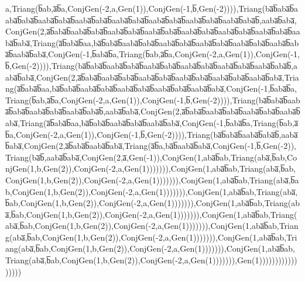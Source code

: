 a,Triang(b̅ab,a̅b̅a,ConjGen(-2,a,Gen(1)),ConjGen(-1,b̅,Gen(-2)))),Triang(ba̅b̅aba̅b̅aaba̅b̅aba̅b̅aaba̅b̅aba̅b̅aaba̅b̅aba̅b̅aaba̅b̅aba̅b̅aaba̅b̅aba̅b̅aaba̅b̅aba̅b̅aaba̅b̅aba̅b̅,aaba̅b̅aba̅,ConjGen(2,a̅b̅aba̅b̅aaba̅b̅aba̅b̅aaba̅b̅aba̅b̅aaba̅b̅aba̅b̅aaba̅b̅aba̅b̅aaba̅b̅aba̅b̅aaba̅b̅aba̅b̅aaba̅b̅aba̅,Triang(a̅b̅aba̅b̅aa,ba̅b̅aba̅b̅aaba̅b̅aba̅b̅aaba̅b̅aba̅b̅aaba̅b̅aba̅b̅aaba̅b̅aba̅b̅aaba̅b̅aba̅b̅aaba̅b̅aba̅,ConjGen(-1,b̅aba̅b̅a,Triang(b̅ab,a̅b̅a,ConjGen(-2,a,Gen(1)),ConjGen(-1,b̅,Gen(-2)))),Triang(ba̅b̅aba̅b̅aaba̅b̅aba̅b̅aaba̅b̅aba̅b̅aaba̅b̅aba̅b̅aaba̅b̅aba̅b̅aaba̅b̅aba̅b̅,aaba̅b̅aba̅,ConjGen(2,a̅b̅aba̅b̅aaba̅b̅aba̅b̅aaba̅b̅aba̅b̅aaba̅b̅aba̅b̅aaba̅b̅aba̅b̅aaba̅b̅aba̅,Triang(a̅b̅aba̅b̅aa,ba̅b̅aba̅b̅aaba̅b̅aba̅b̅aaba̅b̅aba̅b̅aaba̅b̅aba̅b̅aaba̅b̅aba̅,ConjGen(-1,b̅aba̅b̅a,Triang(b̅ab,a̅b̅a,ConjGen(-2,a,Gen(1)),ConjGen(-1,b̅,Gen(-2)))),Triang(ba̅b̅aba̅b̅aaba̅b̅aba̅b̅aaba̅b̅aba̅b̅aaba̅b̅aba̅b̅,aaba̅b̅aba̅,ConjGen(2,a̅b̅aba̅b̅aaba̅b̅aba̅b̅aaba̅b̅aba̅b̅aaba̅b̅aba̅,Triang(a̅b̅aba̅b̅aa,ba̅b̅aba̅b̅aaba̅b̅aba̅b̅aaba̅b̅aba̅,ConjGen(-1,b̅aba̅b̅a,Triang(b̅ab,a̅b̅a,ConjGen(-2,a,Gen(1)),ConjGen(-1,b̅,Gen(-2)))),Triang(ba̅b̅aba̅b̅aaba̅b̅aba̅b̅,aaba̅b̅aba̅,ConjGen(2,a̅b̅aba̅b̅aaba̅b̅aba̅,Triang(a̅b̅a,ba̅b̅aaba̅b̅aba̅,ConjGen(-1,b̅,Gen(-2)),Triang(ba̅b̅,aaba̅b̅aba̅,ConjGen(2,a̅,Gen(-1)),ConjGen(1,aba̅b̅ab,Triang(aba̅,b̅ab,ConjGen(1,b,Gen(2)),ConjGen(-2,a,Gen(1))))))),ConjGen(1,aba̅b̅ab,Triang(aba̅,b̅ab,ConjGen(1,b,Gen(2)),ConjGen(-2,a,Gen(1))))))),ConjGen(1,aba̅b̅ab,Triang(aba̅,b̅ab,ConjGen(1,b,Gen(2)),ConjGen(-2,a,Gen(1))))))),ConjGen(1,aba̅b̅ab,Triang(aba̅,b̅ab,ConjGen(1,b,Gen(2)),ConjGen(-2,a,Gen(1))))))),ConjGen(1,aba̅b̅ab,Triang(aba̅,b̅ab,ConjGen(1,b,Gen(2)),ConjGen(-2,a,Gen(1))))))),ConjGen(1,aba̅b̅ab,Triang(aba̅,b̅ab,ConjGen(1,b,Gen(2)),ConjGen(-2,a,Gen(1))))))),ConjGen(1,aba̅b̅ab,Triang(aba̅,b̅ab,ConjGen(1,b,Gen(2)),ConjGen(-2,a,Gen(1))))))),ConjGen(1,aba̅b̅ab,Triang(aba̅,b̅ab,ConjGen(1,b,Gen(2)),ConjGen(-2,a,Gen(1))))))),ConjGen(1,aba̅b̅ab,Triang(aba̅,b̅ab,ConjGen(1,b,Gen(2)),ConjGen(-2,a,Gen(1))))))),Gen(1)))))))))))))))))